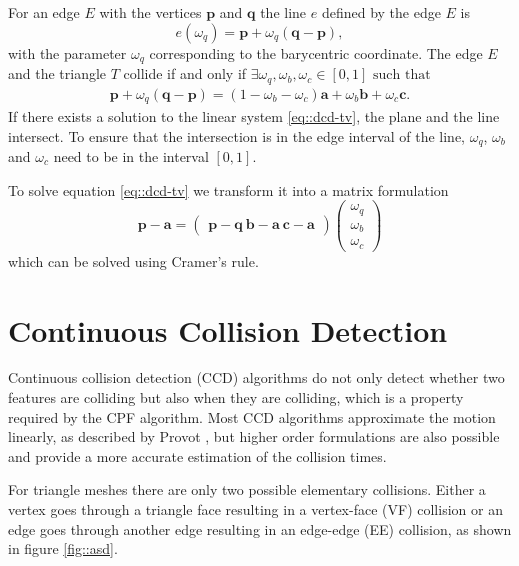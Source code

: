 For an edge $E$ with the vertices $\mathbf p$ and $\mathbf q$ the line $e$ defined by the edge $E$ is
\begin{equation}
e(\omega_q)=\mathbf{p}+\omega_q (\mathbf{q}-\mathbf{p}),
\end{equation}
with the parameter $\omega_q$ corresponding to the barycentric coordinate.
The edge $E$ and the triangle $T$ collide if and only if $\exists \omega_q,\omega_b,\omega_c \in [0,1] \text{ such that}$
\begin{gather}
\label{eq::dcd-tv}
\mathbf{p}+\omega_q(\mathbf{q}-\mathbf{p})=(1-\omega_b-\omega_c)\mathbf a +\omega_b \mathbf b + \omega_c \mathbf c.
\end{gather}
If there exists a solution to the linear system \ref{eq::dcd-tv}, the plane and the line intersect. To ensure that the intersection is in the edge interval of the line, $ \omega_q$, $\omega_b$ and $ \omega_c$ need to be in the interval $[0,1]$.

To solve equation \ref{eq::dcd-tv} we transform it into a matrix formulation
\begin{equation}
	\mathbf{p}-\mathbf{a}=\begin{pmatrix}
	\mathbf{p}-\mathbf{q} \
	\mathbf b -\mathbf a \
	\mathbf c -\mathbf a
	\end{pmatrix}
	\begin{pmatrix}\omega_q\\\omega_b\\\omega_c
	\end{pmatrix}
\end{equation}
which can be solved using Cramer's rule.

\section{Continuous Collision Detection}
\label{sec:CCD}
Continuous collision detection (CCD) algorithms do not only detect whether two features are colliding but also when they are colliding, which is a property required by the CPF algorithm.
 Most CCD algorithms approximate the motion linearly, as described by Provot \cite{PROVOT1997}, but higher order formulations are also possible and provide a more accurate estimation of the collision times.
 
 For triangle meshes there are only two possible elementary collisions. Either a vertex goes through a triangle face resulting in a vertex-face (VF) collision or an edge goes through another edge resulting in an edge-edge (EE) collision, as shown in figure \ref{fig::asd}.


